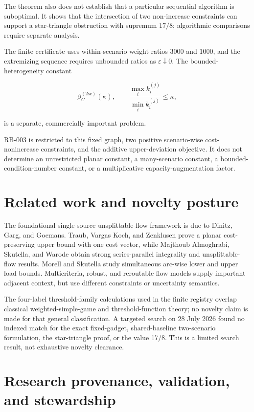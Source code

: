 \documentclass[
  11pt,
]{article}
\begin{document}
The theorem also does not establish that a particular sequential
algorithm is suboptimal. It shows that the intersection of two
non-increase constraints can support a star-triangle obstruction with
supremum \(17/8\); algorithmic comparisons require separate analysis.

The finite certificate uses within-scenario weight ratios 3000 and 1000,
and the extremizing sequence requires unbounded ratios as
\(\varepsilon\downarrow0\). The bounded-heterogeneity constant

\[
\beta_G^{(2\mathrm{sc})}(\kappa),
\qquad
\frac{\max_i k_i^{(j)}}{\min_i k_i^{(j)}}\le\kappa,
\]

is a separate, commercially important problem.

RB-003 is restricted to this fixed graph, two positive scenario-wise
cost-nonincrease constraints, and the additive upper-deviation
objective. It does not determine an unrestricted planar constant, a
many-scenario constant, a bounded-condition-number constant, or a
multiplicative capacity-augmentation factor.

\section{Related work and novelty
posture}\label{related-work-and-novelty-posture}

The foundational single-source unsplittable-flow framework is due to
Dinitz, Garg, and Goemans. Traub, Vargas Koch, and Zenklusen prove a
planar cost-preserving upper bound with one cost vector, while Majthoub
Almoghrabi, Skutella, and Warode obtain strong series-parallel
integrality and unsplittable-flow results. Morell and Skutella study
simultaneous arc-wise lower and upper load bounds. Multicriteria,
robust, and reroutable flow models supply important adjacent context,
but use different constraints or uncertainty semantics.

The four-label threshold-family calculations used in the finite registry
overlap classical weighted-simple-game and threshold-function theory; no
novelty claim is made for that general classification. A targeted search
on 28 July 2026 found no indexed match for the exact fixed-gadget,
shared-baseline two-scenario formulation, the star-triangle proof, or
the value 17/8. This is a limited search result, not exhaustive novelty
clearance.

\section{Research provenance, validation, and
stewardship}\label{research-provenance-validation-and-stewardship}
\end{document}
